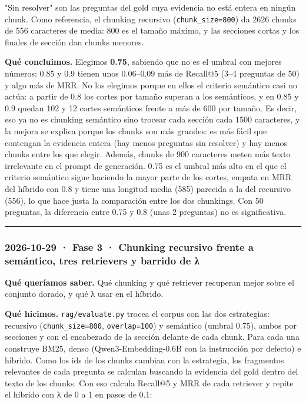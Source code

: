 "Sin resolver" son las preguntas del gold cuya evidencia no está entera en ningún chunk. Como
referencia, el chunking recursivo (\texttt{chunk\_\allowbreak{}size=\allowbreak{}800}) da 2626 chunks de 556 caracteres de media:
800 es el tamaño máximo, y las secciones cortas y los finales de sección dan chunks menores.

\textbf{Qué concluimos.} Elegimos \textbf{0.75}, sabiendo que no es el umbral con mejores números: 0.85 y
0.9 tienen unos 0.06--0.09 más de Recall@5 (3--4 preguntas de 50) y algo más de MRR. No los
elegimos porque en ellos el criterio semántico casi no actúa: a partir de 0.8 los cortes por
tamaño superan a los semánticos, y en 0.85 y 0.9 quedan 102 y 12 cortes semánticos frente a más
de 600 por tamaño. Es decir, eso ya no es chunking semántico sino trocear cada sección cada 1500
caracteres, y la mejora se explica porque los chunks son más grandes: es más fácil que contengan
la evidencia entera (hay menos preguntas sin resolver) y hay menos chunks entre los que elegir.
Además, chunks de 900 caracteres meten más texto irrelevante en el prompt de generación. 0.75 es
el umbral más alto en el que el criterio semántico sigue haciendo la mayor parte de los cortes,
empata en MRR del híbrido con 0.8 y tiene una longitud media (585) parecida a la del recursivo
(556), lo que hace justa la comparación entre los dos chunkings. Con 50 preguntas, la diferencia
entre 0.75 y 0.8 (unas 2 preguntas) no es significativa.

\begin{center}\rule{0.5\linewidth}{0.5pt}\end{center}

\subsubsection{2026-10-29 · Fase 3 · Chunking recursivo frente a semántico, tres retrievers y barrido de λ}

\textbf{Qué queríamos saber.} Qué chunking y qué retriever recuperan mejor sobre el conjunto dorado,
y qué λ usar en el híbrido.

\textbf{Qué hicimos.} \texttt{rag/\allowbreak{}evaluate.py} trocea el corpus con las dos estrategias: recursivo
(\texttt{chunk\_\allowbreak{}size=\allowbreak{}800}, \texttt{overlap=\allowbreak{}100}) y semántico (umbral 0.75), ambos por secciones y con el
encabezado de la sección delante de cada chunk. Para cada una construye BM25, denso
(Qwen3-Embedding-0.6B con la instrucción por defecto) e híbrido. Como los ids de los chunks
cambian con la estrategia, los fragmentos relevantes de cada pregunta se calculan buscando la
evidencia del gold dentro del texto de los chunks. Con eso calcula Recall@5 y MRR de cada
retriever y repite el híbrido con λ de 0 a 1 en pasos de 0.1:

